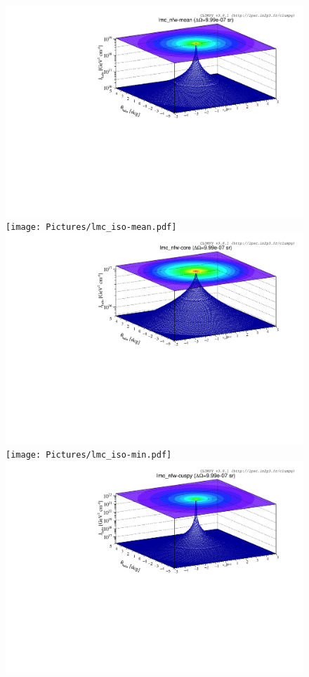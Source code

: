 \documentclass[main.tex]{subfiles}
\begin{document}
\begin{figure}
\centering
{}
\includegraphics[width=1\textwidth]{Pictures/lmc_nfw-mean.pdf}
\endminipage 
{}
\texttt{[image: Pictures/lmc\_iso-mean.pdf]}
\endminipage \\
\includegraphics[width=1\textwidth]{Pictures/lmc_nfw-core.pdf}
\endminipage
{}
\texttt{[image: Pictures/lmc\_iso-min.pdf]}
\endminipage \\
\includegraphics[width=1\textwidth]{Pictures/lmc_nfw-cuspy.pdf}

\end{figure}
\end{document}
